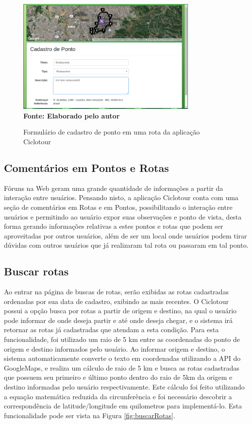 \begin{figure}[!ht]
	\centering	
	\caption[\hspace{0.1cm} Cadastro de Pontos em Rotas da aplicação Ciclotour.]
	{Formulário de cadastro de ponto em uma rota da aplicação Ciclotour}
	  \vspace{-0.4cm}
	\includegraphics[width=0.8\textwidth]{figuras/cadastroPonto.png}
	 \vspace{0cm}
	\\\textbf{\footnotesize Fonte: Elaborado pelo autor}
	\label{fig:cadastroPonto}
\end{figure}

\subsection{Comentários em Pontos e Rotas}
Fóruns na Web geram uma grande quantidade de informações a partir da interação entre usuários. Pensando nisto, a aplicação Ciclotour conta com uma 
seção de comentários em Rotas e em Pontos, possibilitando o interação entre usuários e permitindo ao usuário expor suas observações e ponto de 
vista, desta forma gerando informações relativas a estes pontos e rotas que podem ser aproveitadas por outros usuários, além de ser um local onde 
usuários podem tirar dúvidas com outros usuários que já realizaram tal rota ou passaram em tal ponto.

\subsection{Buscar rotas}
Ao entrar na página de buscas de rotas, serão exibidas as rotas cadastradas ordenadas por sua data de cadastro, exibindo as mais recentes.
O Ciclotour possui a opção busca por rotas a partir de origem e destino, na qual o usuário pode informar de onde deseja partir e até onde deseja 
chegar, e o sistema irá retornar as rotas já cadastradas que atendam a esta condição. Para esta funcionalidade, foi utilizado um raio de 5 km entre 
as coordenadas do ponto de origem e destino informados pelo usuário. Ao informar origem e destino, o sistema automaticamente converte o texto em 
coordenadas utilizando a API do GoogleMaps, e realiza um cálculo de raio de 5 km e busca as rotas cadastradas que possuem seu primeiro e último ponto
dentro do raio de 5km da origem e destino informadas pelo usuário respectivamente. Este cálculo foi feito utilizando a equação matemática reduzida da 
circunferência e foi necessário descobrir a correspondência de latitude/longitude em quilometros para implementá-lo. Esta funcionalidade pode ser 
vista na Figura \ref{fig:buscarRotas}.


